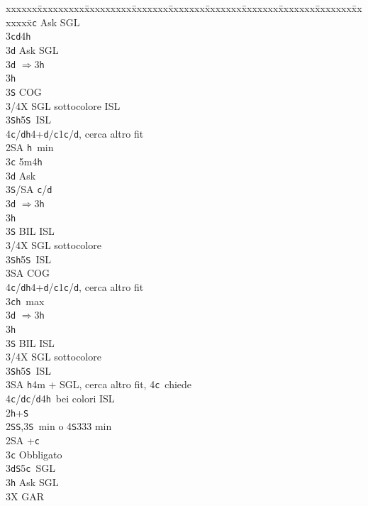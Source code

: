 \documentclass[a4paper,italian]{article}
\newcommand{\BS}{\small{\texttt{S}}}
\newcommand{\BC}{\small{\texttt{c}}}
\newcommand{\BD}{\small{\texttt{d}}}
\newcommand{\BH}{\small{\texttt{h}}}
\newenvironment{bidtable}
{\begin{tabbing}

    xxxxxx\=xxxxxxxxx\=xxxxxxxxx\=xxxxxxx\=xxxxxxx\=xxxxxxx\=xxxxxxx\=xxxxxxx\=xxxxxxx\=xxxxxxx\=\kill}
{\end{tabbing} }%
\begin{document}
\begin{multicols}{2}
\begin{bidtable}
        3\BC \> Ask SGL\-\\
        3\BC {}\BD 4\BH \+\\
        3\BD \> Ask SGL\-\\
        3\BD \> $\Rightarrow$3\BH\+\\
        3\BH\+\\
        3\BS \> COG\\
        3/4X\> SGL sottocolore ISL\-\-\\
        3\BS {}\BH 5\BS\ ISL\\
        4\BC/\BD {}\BH4+\BD/\BC1\BC/\BD, cerca altro fit \-\\
        2\small{SA} \BH\ min\+\\
        3\BC \> 5m4\BH \+\\
        3\BD \> Ask\+\\
        3\BS/SA \> \BC /\BD \-\-\\
        3\BD \> $\Rightarrow$3\BH\+\\
        3\BH\+\\
        3\BS \> BIL ISL\\
        3/4X \> SGL sottocolore \-\-\\
        3\BS {}\BH 5\BS\ ISL\\
        3\small{SA}\> COG \\
        4\BC/\BD{}\BH4+\BD/\BC1\BC/\BD, cerca altro fit\-\\
        3\BC {}\BH\ max\+\\
        3\BD \> $\Rightarrow$3\BH\+\\
        3\BH\+\\
        3\BS \> BIL ISL\\
        3/4X \> SGL sottocolore \-\-\\
        3\BS {}\BH 5\BS\ ISL\\
        3\small{SA} \BH4m + SGL, cerca altro fit, 4\BC\ chiede\\
        4\BC/\BD {}\BC /\BD4\BH\ bei colori ISL\-\-\\
        2\BH {}+\BS \+\\
        2\BS {}\BS ,3\BS\ min o 4\BS 333 min\+\\
        2\small{SA} +\BC \+\\
        3\BC \> Obbligato\+\\
        3\BD {}\BS 5\BC\ SGL\+\\
        3\BH \> Ask SGL\-\\
        3X \> GAR\-\-\\

\end{bidtable}
\end{multicols}
\end{document}
